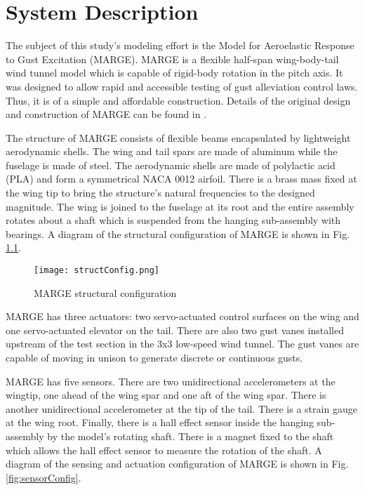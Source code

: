 \chapter{System Description}
\label{ch:sysDescription}

The subject of this study's modeling effort is the Model for Aeroelastic Response to Gust Excitation (MARGE). MARGE is a flexible half-span wing-body-tail wind tunnel model which is capable of rigid-body rotation in the pitch axis. It was designed to allow rapid and accessible testing of gust alleviation control laws. Thus, it is of a simple and affordable construction. Details of the original design and construction of MARGE can be found in \cite{Quenzer2019}.

The structure of MARGE consists of flexible beams encapsulated by lightweight aerodynamic shells. The wing and tail spars are made of aluminum while the fuselage is made of steel. The aerodynamic shells are made of polylactic acid (PLA) and form a symmetrical NACA 0012 airfoil. There is a brass mass fixed at the wing tip to bring the structure's natural frequencies to the designed magnitude. The wing is joined to the fuselage at its root and the entire assembly rotates about a shaft which is suspended from the hanging sub-assembly with bearings. A diagram of the structural configuration of MARGE is shown in Fig. \ref{fig:structureConfig}.
\begin{figure}[h]
    \centering
    \texttt{[image: structConfig.png]}
    \caption{MARGE structural configuration}
    \label{fig:structureConfig}
\end{figure}

MARGE has three actuators: two servo-actuated control surfaces on the wing and one servo-actuated elevator on the tail. There are also two gust vanes installed upstream of the test section in the 3x3 low-speed wind tunnel. The gust vanes are capable of moving in unison to generate discrete or continuous gusts.

MARGE has five sensors. There are two unidirectional accelerometers at the wingtip, one ahead of the wing spar and one aft of the wing spar. There is another unidirectional accelerometer at the tip of the tail. There is a strain gauge at the wing root. Finally, there is a hall effect sensor inside the hanging sub-assembly by the model's rotating shaft. There is a magnet fixed to the shaft which allows the hall effect sensor to measure the rotation of the shaft. A diagram of the sensing and actuation configuration of MARGE is shown in Fig. \ref{fig:sensorConfig}.

